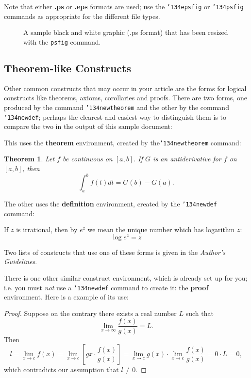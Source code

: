 \documentclass{sig-alternate}
\begin{document}
Note that either {\textbf{.ps}} or {\textbf{.eps}} formats are
used; use
the \texttt{{\char'134}epsfig} or \texttt{{\char'134}psfig}
commands as appropriate for the different file types.

\begin{figure}
\centering
{}
\caption{A sample black and white graphic (.ps format) that has
been resized with the \texttt{psfig} command.}
\vskip -6pt
\end{figure}

\subsection{Theorem-like Constructs}
Other common constructs that may occur in your article are
the forms for logical constructs like theorems, axioms,
corollaries and proofs.  There are
two forms, one produced by the
command \texttt{{\char'134}newtheorem} and the
other by the command \texttt{{\char'134}newdef}; perhaps
the clearest and easiest way to distinguish them is
to compare the two in the output of this sample document:

This uses the \textbf{theorem} environment, created by
the\linebreak\texttt{{\char'134}newtheorem} command:
\newtheorem{theorem}{Theorem}
\begin{theorem}
Let $f$ be continuous on $[a,b]$.  If $G$ is
an antiderivative for $f$ on $[a,b]$, then
\begin{displaymath}\int^b_af(t)dt = G(b) - G(a).\end{displaymath}
\end{theorem}

The other uses the \textbf{definition} environment, created
by the \texttt{{\char'134}newdef} command:
\begin{definition}
If $z$ is irrational, then by $e^z$ we mean the
unique number which has
logarithm $z$: \begin{displaymath}{\log e^z = z}\end{displaymath}
\end{definition}

Two lists of constructs that use one of these
forms is given in the
\textit{Author's  Guidelines}.
 
There is one other similar construct environment, which is
already set up
for you; i.e. you must \textit{not} use
a \texttt{{\char'134}newdef} command to
create it: the \textbf{proof} environment.  Here
is a example of its use:
\begin{proof}
Suppose on the contrary there exists a real number $L$ such that
\begin{displaymath}
\lim_{x\rightarrow\infty} \frac{f(x)}{g(x)} = L.
\end{displaymath}
Then
\begin{displaymath}
l=\lim_{x\rightarrow c} f(x)
= \lim_{x\rightarrow c}
\left[ g{x} \cdot \frac{f(x)}{g(x)} \right ]
= \lim_{x\rightarrow c} g(x) \cdot \lim_{x\rightarrow c}
\frac{f(x)}{g(x)} = 0\cdot L = 0,
\end{displaymath}
which contradicts our assumption that $l\neq 0$.
\end{proof}
\end{document}
